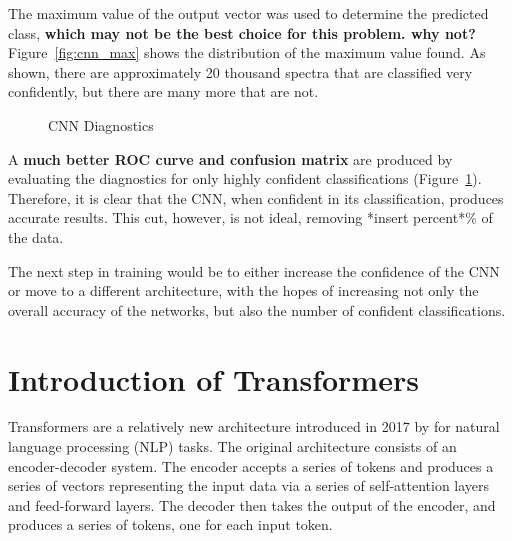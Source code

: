 The maximum value of the output vector was used to determine the predicted class,
\textbf{which may not be the best choice for this problem. why not?} Figure~\ref{fig:cnn_max} shows
the distribution of the maximum value found. As shown, there are approximately 
20 thousand spectra that are classified very confidently, but there are many
more that are not.
\begin{figure}[t]
    \centering
    \qquad
    \caption{CNN Diagnostics\label{fig:cnn_qual2}}
\end{figure}

A \textbf{much better ROC curve and confusion matrix }are produced by 
evaluating the diagnostics for only highly confident classifications (Figure~\ref{fig:cnn_qual2}). 
Therefore, it is clear that the CNN, when confident in its classification, produces 
accurate results. This cut, however, is not ideal, removing *insert percent*\% of the 
data. 

The next step in training would be to either increase the confidence of the CNN 
or move to a different architecture, with the hopes of increasing not only 
the overall accuracy of the networks, but also the number of confident classifications.

\section{Introduction of Transformers}\label{sec:transformers}
Transformers are a relatively new architecture introduced in 2017 by \textcite{vaswani2017}
for natural language processing (NLP) tasks. The original architecture consists of 
an encoder-decoder system. The encoder accepts a series of tokens and produces a series of vectors
representing the input data via a series 
of self-attention layers and feed-forward layers. The decoder then takes the output of the encoder, and
produces a series of tokens, one for each input token. 


